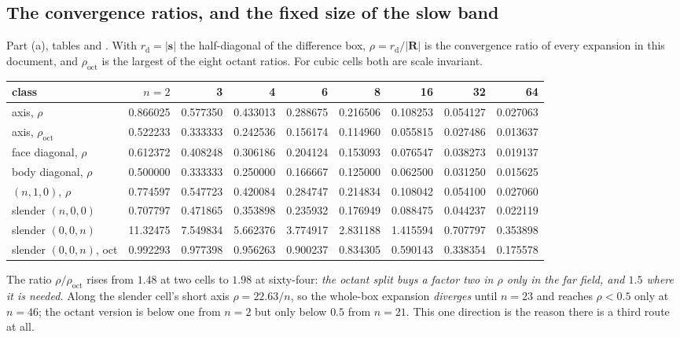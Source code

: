 \subsection{The convergence ratios, and the fixed size of the slow band}
\label{sec:grd:rho}

Part (a), tables  and . With
$r_{\mathrm{d}} = |\mathbf{s}|$ the half-diagonal of the difference box,
$\rho = r_{\mathrm{d}}/|\mathbf{R}|$ is the convergence ratio of every expansion in this
document, and $\rho_{\mathrm{oct}}$ is the largest of the eight octant ratios. For cubic
cells both are scale invariant.

\begin{center}\footnotesize
\begin{tabular}{@{}lrrrrrrrr@{}}
\toprule
class & $n = 2$ & 3 & 4 & 6 & 8 & 16 & 32 & 64\\
\midrule
axis, $\rho$ & 0.866025 & 0.577350 & 0.433013 & 0.288675 & 0.216506 & 0.108253 & 0.054127 & 0.027063\\
axis, $\rho_{\mathrm{oct}}$ & 0.522233 & 0.333333 & 0.242536 & 0.156174 & 0.114960 & 0.055815 & 0.027486 & 0.013637\\
face diagonal, $\rho$ & 0.612372 & 0.408248 & 0.306186 & 0.204124 & 0.153093 & 0.076547 & 0.038273 & 0.019137\\
body diagonal, $\rho$ & 0.500000 & 0.333333 & 0.250000 & 0.166667 & 0.125000 & 0.062500 & 0.031250 & 0.015625\\
$(n,1,0)$, $\rho$ & 0.774597 & 0.547723 & 0.420084 & 0.284747 & 0.214834 & 0.108042 & 0.054100 & 0.027060\\
\midrule
slender $(n,0,0)$ & 0.707797 & 0.471865 & 0.353898 & 0.235932 & 0.176949 & 0.088475 & 0.044237 & 0.022119\\
slender $(0,0,n)$ & 11.32475 & 7.549834 & 5.662376 & 3.774917 & 2.831188 & 1.415594 & 0.707797 & 0.353898\\
slender $(0,0,n)$, oct & 0.992293 & 0.977398 & 0.956263 & 0.900237 & 0.834305 & 0.590143 & 0.338354 & 0.175578\\
\bottomrule
\end{tabular}
\end{center}

\noindent
The ratio $\rho/\rho_{\mathrm{oct}}$ rises from $1.48$ at two cells to $1.98$ at
sixty-four: \emph{the octant split buys a factor two in $\rho$ only in the far field, and
$1.5$ where it is needed.} Along the slender cell's short axis $\rho = 22.63/n$, so the
whole-box expansion \emph{diverges} until $n = 23$ and reaches $\rho < 0.5$ only at
$n = 46$; the octant version is below one from $n = 2$ but only below $0.5$ from $n = 21$.
This one direction is the reason there is a third route at all.


